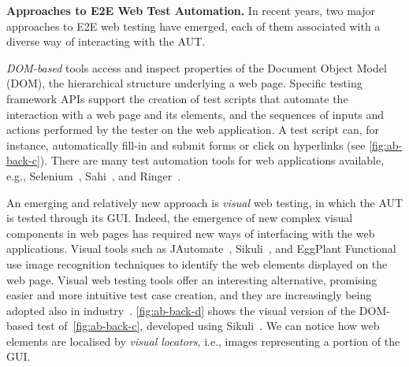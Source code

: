 \noindent
\textbf{Approaches to E2E Web Test Automation.}
In recent years, two major approaches to E2E web testing have emerged, each of them associated with a diverse way of interacting with the AUT. 

\textit{DOM-based} tools access and inspect properties of the Document Object Model (DOM), the hierarchical structure underlying a web page. 
Specific testing framework APIs support the creation of test scripts that automate the interaction with a web page and its elements, and the sequences of inputs and actions performed by the tester on the web application. A test script can, for instance, automatically fill-in and submit forms or click on hyperlinks (see \autoref{fig:ab-back-c}). There are many test automation tools for web applications available, e.g., Selenium~\cite{selenium}, Sahi~\cite{sahi}, and Ringer~\cite{ringer}. %

An emerging and relatively new approach is \textit{visual} web testing, in which the AUT is tested through its GUI. Indeed, the emergence of new complex visual components in web pages has required new ways of interfacing with the web applications. Visual tools such as JAutomate~\cite{Alegroth2013jat}, Sikuli~\cite{Sikuli}, and EggPlant Functional~\cite{eggplant} use image recognition techniques to identify the web elements displayed on the web page. Visual web testing tools offer an interesting alternative, promising easier and more intuitive test case creation, and they are increasingly being adopted also in industry~\cite{Alegroth2013jat}. 
\autoref{fig:ab-back-d} shows the visual version of the DOM-based test of~\autoref{fig:ab-back-c}, developed using Sikuli~\cite{Sikuli}. We can notice how web elements are localised by \textit{visual locators}, i.e., images representing a portion of the GUI.

